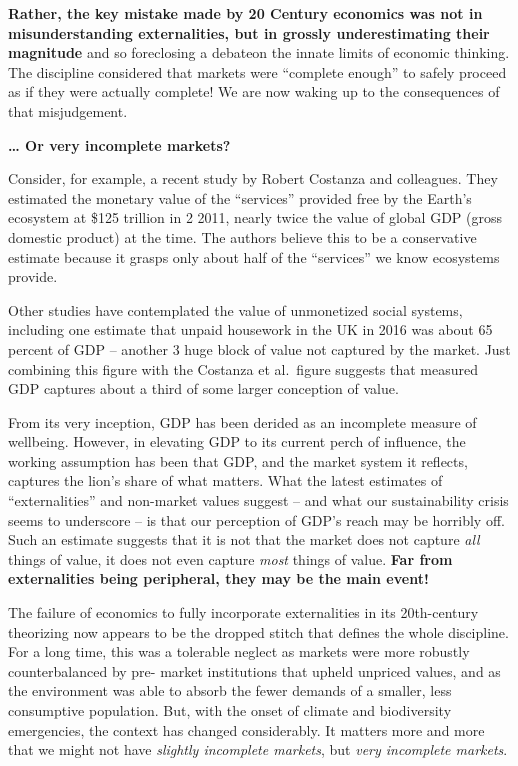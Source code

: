 \documentclass[
]{book}
\begin{document}
\textbf{Rather, the key mistake made by 20 Century economics was not in misunderstanding
externalities, but in grossly underestimating their magnitude} and
so foreclosing a debateon the innate limits of economic thinking.
The discipline considered that markets were ``complete enough'' to
safely proceed as if they were actually complete!
We are now waking up to the consequences of that misjudgement.

\textbf{\ldots{} Or very incomplete markets?}

Consider, for example, a recent study by Robert Costanza and colleagues. They estimated
the monetary value of the ``services'' provided free by the Earth's ecosystem at \$125 trillion in
2
2011, nearly twice the value of global GDP (gross domestic product) at the time.
The authors believe this to be a conservative estimate because it grasps only about half of the ``services'' we know ecosystems provide.

Other studies have contemplated the value of unmonetized social systems, including one
estimate that unpaid housework in the UK in 2016 was about 65 percent of GDP -- another
3
huge block of value not captured by the market. Just combining this figure with the Costanza
et al.~figure suggests that measured GDP captures about a third of some larger conception of
value.

From its very inception, GDP has been derided as an incomplete measure of wellbeing.
However, in elevating GDP to its current perch of influence, the working assumption has been
that GDP, and the market system it reflects, captures the lion's share of what matters. What
the latest estimates of ``externalities'' and non-market values suggest -- and what our
sustainability crisis seems to underscore -- is that our perception of GDP's reach may be
horribly off. Such an estimate suggests that it is not that the market does not capture \emph{all} things of value, it does not even capture \emph{most} things of value.
\textbf{Far from externalities being peripheral, they may be the main event!}

The failure of economics to fully incorporate externalities in its 20th-century
theorizing now appears to be the dropped stitch that defines the whole discipline. For a long
time, this was a tolerable neglect as markets were more robustly counterbalanced by pre-
market institutions that upheld unpriced values, and as the environment was able to absorb
the fewer demands of a smaller, less consumptive population. But, with the onset of climate
and biodiversity emergencies, the context has changed considerably. It matters more and
more that we might not have \emph{slightly incomplete markets}, but \emph{very incomplete markets}.
\end{document}
